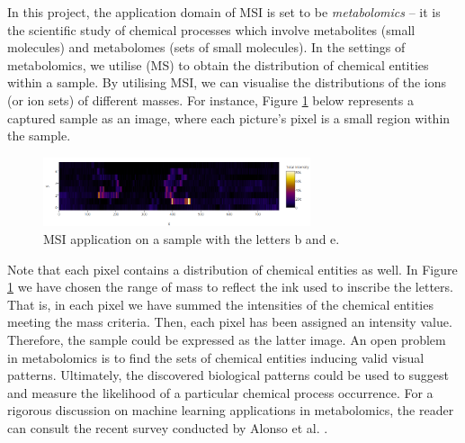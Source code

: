 \documentclass{mprop}
\begin{document}
\par In this project, the application domain of MSI is set to be \textit{metabolomics} -- it is the scientific study of chemical processes which involve metabolites (small molecules) and metabolomes (sets of small molecules). In the settings of metabolomics, we utilise  (MS) to obtain the distribution of chemical entities within a sample. By utilising MSI, we can visualise the distributions of the ions (or ion sets) of different masses. For instance, Figure \ref{fig:b_and_e} below represents a captured sample as an image, where each picture's pixel is a small region within the sample. 
\begin{figure}[H]
  \centering
  \includegraphics[width=0.7\textwidth]{b_and_e}
  \caption{MSI application on a sample with the letters b and e.}
  \label{fig:b_and_e}
\end{figure}
Note that each pixel contains a distribution of chemical entities as well. In Figure \ref{fig:b_and_e} we have chosen the range of mass to reflect the ink used to inscribe the letters. That is, in each pixel we have summed the intensities of the chemical entities meeting the mass criteria. Then, each pixel has been assigned an intensity value. Therefore, the sample could be expressed as the latter image. An open problem in metabolomics is to find the sets of chemical entities  inducing valid visual patterns. Ultimately, the discovered biological patterns could be used to suggest and measure the likelihood of a particular chemical process occurrence. For a rigorous discussion on machine learning applications in metabolomics, the reader can consult the recent survey conducted by Alonso et al. \cite{alonso-et-al}.


\end{document}
